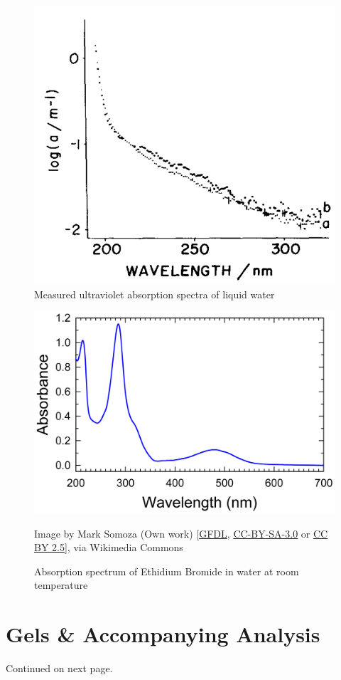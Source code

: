 \documentclass[a4paper,xcolor=table]{article}
\begin{document}
\begin{figure}[ht]
\begin{center}
\includegraphics[width=.33\textwidth]{waterAbsProf.png}
\caption{Measured ultraviolet absorption spectra of liquid water\cite{uvWaterAbs}}
\label{fig:waterAbs}
\end{center}
\end{figure}

\begin{figure}[ht]
\begin{center}
\includegraphics[width=.33\textwidth]{etbrAbs.png}
\caption{Absorption spectrum of Ethidium Bromide in water at room temperature}
{\small Image by Mark Somoza (Own work) [\href{http://www.gnu.org/copyleft/fdl.html}{GFDL}, \href{http://creativecommons.org/licenses/by-sa/3.0/}{CC-BY-SA-3.0} or \href{http://creativecommons.org/licenses/by/2.5}{CC BY 2.5}], via Wikimedia Commons}
\label{fig:etbrAbs}
\end{center}
\end{figure}




\section{Gels \& Accompanying Analysis}
\label{sec:gelAnalysis}
Continued on next page.

\newcommand{\gel}[3]{
\begin{figure}[ht]
\label{#3}
\begin{center}
\texttt{[image: \#1]}
\caption{#2}
\end{center}
\subsection{#2 Analysis}
#3 (More images of this gel below.)
\end{figure}
}
\end{document}
